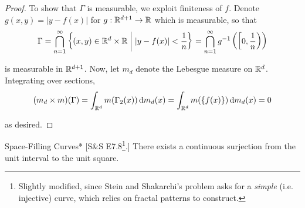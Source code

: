 \begin{proof}
    To show that \(\Gamma\) is measurable, we exploit finiteness of \(f\). Denote \(g(x, y) = |y - f(x)|\) for \(g : \mathbb{R}^{d+1} \to \mathbb{R}\) which is measurable, so that
    \[
        \Gamma 
        = \bigcap_{n=1}^\infty \left\{ (x, y) \in \mathbb{R}^d \times \mathbb{R} \;\biggr\rvert\; |y - f(x)| < \frac{1}{n} \right\}
        = \bigcap_{n=1}^\infty g^{-1}\left(\left[0, \frac{1}{n}\right)\right)
    \]

    is measurable in \(\mathbb{R}^{d+1}\). Now, let \(m_d\) denote the Lebesgue measure on \(\mathbb{R}^d\). Integrating over sections, 
    \[
        (m_d \times m)(\Gamma)
        = \int_{\mathbb{R}^d} m(\Gamma_2(x)) \, \mathrm{d}m_d(x)
        = \int_{\mathbb{R}^d} m(\{f(x)\}) \, \mathrm{d}m_d(x)
        = 0
    \]

    as desired. 
\end{proof}

\begin{problem}{Space-Filling Curves}*
    [S\&S E7.8\footnote{Slightly modified, since Stein and Shakarchi's problem asks for a \textit{simple} (i.e. injective) curve, which relies on fractal patterns to construct.}.] There exists a continuous surjection from the unit interval to the unit square.
\end{problem}


